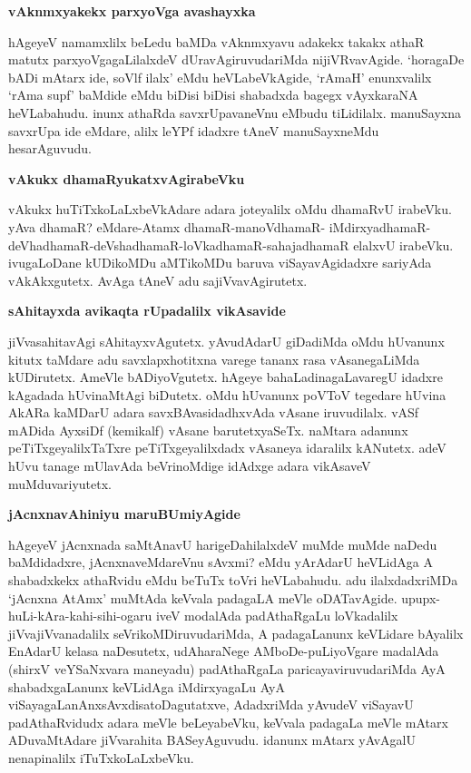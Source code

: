 \textbf{vAknmxyakekx parxyoVga avashayxka}

hAgeyeV namamxlilx beLedu baMDa vAknmxyavu adakekx takakx athaR matutx parxyoVgagaLilalxdeV dUravAgiruvudariMda nijiVRvavAgide. `horagaDe bADi mAtarx ide, soVlf ilalx' eMdu heVLabeVkAgide, `rAmaH' enunxvalilx `rAma supf' baMdide eMdu biDisi biDisi shabadxda bagegx vAyxkaraNA heVLabahudu. inunx athaRda savxrUpavaneVnu eMbudu tiLidilalx. manuSayxna savxrUpa ide eMdare, alilx leYPf idadxre tAneV manuSayxneMdu hesarAguvudu.

\textbf{vAkukx dhamaRyukatxvAgirabeVku}

vAkukx huTiTxkoLaLxbeVkAdare adara joteyalilx oMdu dhamaRvU irabeVku. 
yAva dhamaR? eMdare-Atamx dhamaR-manoVdhamaR- 
iMdirxyadhamaR-deVhadhamaR-deVshadhamaR-loVkadhamaR-sahajadhamaR elalxvU irabeVku. ivugaLoDane kUDikoMDu aMTikoMDu baruva viSayavAgidadxre sariyAda vAkAkxgutetx. AvAga tAneV adu sajiVvavAgirutetx. 

\textbf{sAhitayxda avikaqta rUpadalilx vikAsavide}

jiVvasahitavAgi sAhitayxvAgutetx. yAvudAdarU giDadiMda oMdu hUvanunx kitutx taMdare adu savxlapxhotitxna varege tananx rasa vAsanegaLiMda kUDirutetx. AmeVle bADiyoVgutetx. hAgeye bahaLadinagaLavaregU idadxre kAgadada hUvinaMtAgi biDutetx. oMdu hUvanunx poVToV tegedare hUvina AkARa kaMDarU adara savxBAvasidadhxvAda vAsane iruvudilalx. vASf mADida AyxsiDf (kemikalf) vAsane barutetxyaSeTx. naMtara adanunx peTiTxgeyalilxTaTxre peTiTxgeyalilxdadx vAsaneya idaralilx kANutetx. adeV hUvu tanage mUlavAda beVrinoMdige idAdxge adara vikAsaveV muMduvariyutetx.

\textbf{jAcnxnavAhiniyu maruBUmiyAgide}

hAgeyeV jAcnxnada saMtAnavU harigeDahilalxdeV muMde muMde naDedu 
baMdidadxre, jAcnxnaveMdareVnu sAvxmi? eMdu yArAdarU heVLidAga A 
shabadxkekx athaRvidu eMdu beTuTx toVri heVLabahudu. adu ilalxdadxriMDa 
`jAcnxna AtAmx' muMtAda keVvala padagaLA meVle oDATavAgide. 
upupx-huLi-kAra-kahi-sihi-ogaru iveV modalAda padAthaRgaLu loVkadalilx 
jiVvajiVvanadalilx seVrikoMDiruvudariMda, A padagaLanunx keVLidare bAyalilx EnAdarU kelasa naDesutetx, udAharaNege AMboDe-puLiyoVgare madalA\-da (shirxV veYSaNxvara maneyadu) padAthaRgaLa paricayaviruvudariMda AyA shabadxgaLanunx keVLidAga iMdirxyagaLu AyA viSayagaLanAnxsAvxdisatoDagutatxve, AdadxriMda yAvudeV viSayavU padAthaRvidudx adara meVle beLeyabeVku, keVvala padagaLa meVle mAtarx ADuvaMtAdare jiVvarahita BASeyAguvudu. idanunx mAtarx yAvAgalU nenapinalilx iTuTxkoLaLxbeVku.

